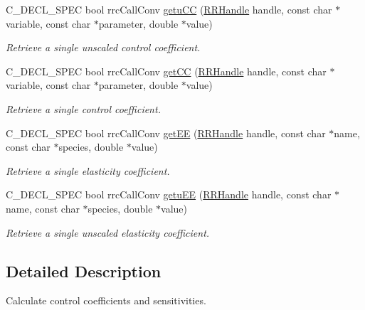 \begin{DoxyCompactItemize}
C\-\_\-\-D\-E\-C\-L\-\_\-\-S\-P\-E\-C bool rrc\-Call\-Conv \hyperlink{group__mca_gae9f84e6ea3736a774eecd6e9585299b4}{getu\-C\-C} (\hyperlink{rrc__types_8h_a1d68f0592372208fa5a5f2799ea4b3ae}{R\-R\-Handle} handle, const char $\ast$variable, const char $\ast$parameter, double $\ast$value)
\begin{DoxyCompactList}\small\item\em Retrieve a single unscaled control coefficient. \end{DoxyCompactList}\item 
C\-\_\-\-D\-E\-C\-L\-\_\-\-S\-P\-E\-C bool rrc\-Call\-Conv \hyperlink{group__mca_ga186d25721094be37bf8f82dcc2662652}{get\-C\-C} (\hyperlink{rrc__types_8h_a1d68f0592372208fa5a5f2799ea4b3ae}{R\-R\-Handle} handle, const char $\ast$variable, const char $\ast$parameter, double $\ast$value)
\begin{DoxyCompactList}\small\item\em Retrieve a single control coefficient. \end{DoxyCompactList}\item 
C\-\_\-\-D\-E\-C\-L\-\_\-\-S\-P\-E\-C bool rrc\-Call\-Conv \hyperlink{group__mca_ga1965125a33ed28f80fbdce867f8bde93}{get\-E\-E} (\hyperlink{rrc__types_8h_a1d68f0592372208fa5a5f2799ea4b3ae}{R\-R\-Handle} handle, const char $\ast$name, const char $\ast$species, double $\ast$value)
\begin{DoxyCompactList}\small\item\em Retrieve a single elasticity coefficient. \end{DoxyCompactList}\item 
C\-\_\-\-D\-E\-C\-L\-\_\-\-S\-P\-E\-C bool rrc\-Call\-Conv \hyperlink{group__mca_ga0b1b29ecf19805b173e35ca3388d3deb}{getu\-E\-E} (\hyperlink{rrc__types_8h_a1d68f0592372208fa5a5f2799ea4b3ae}{R\-R\-Handle} handle, const char $\ast$name, const char $\ast$species, double $\ast$value)
\begin{DoxyCompactList}\small\item\em Retrieve a single unscaled elasticity coefficient. \end{DoxyCompactList}\end{DoxyCompactItemize}


\subsection{Detailed Description}
Calculate control coefficients and sensitivities. 

